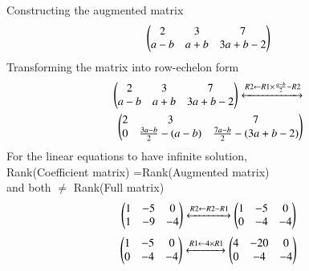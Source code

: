 Constructing the augmented matrix \\
$$
\begin{pmatrix}
    2 & 3 & 7 \\ 
    \emph{a}-{b}& \emph{a}+{b} & 3\emph{a}+{b}-2
\end{pmatrix}
$$
Transforming the matrix into row-echelon form \\
\begin{align}
\begin{pmatrix}
2 & 3 & 7 \\
\emph{a}-{b} & \emph{a}+{b} & 3\emph{a}+{b}-2
\end{pmatrix}
  \xleftrightarrow[]{R2 \leftarrow R1\times\frac{\emph{a}-{b}}{2} - R2 } \nonumber \\
\begin{pmatrix}
2& 3& 7\\
0 & \frac{3\emph{a}-{b}}{2}-(\emph{a}-b) & \frac{7\emph{a}-{b}}{2}-(3\emph{a}+b-2)
\end{pmatrix}
\end{align}
For the linear equations to have infinite  solution, \\
Rank(Coefficient matrix) =Rank(Augmented matrix) \\
and both  $\neq$ Rank(Full matrix) \\
\begin{align}
\begin{pmatrix}
1 & -5 & 0\\
1 & -9 &-4
\end{pmatrix}
  \xleftrightarrow[]{R2 \leftarrow R2-R1}
\begin{pmatrix}
1& -5& 0\\
0 & -4 & -4\\
\end{pmatrix}
\end{align}
\begin{align}
\begin{pmatrix}
1 & -5 & 0\\
0 & -4 &-4
\end{pmatrix}
  \xleftrightarrow[]{R1 \leftarrow 4\times R1}
\begin{pmatrix}
4& -20& 0\\
0 & -4 & -4\\
\end{pmatrix}
\end{align}

